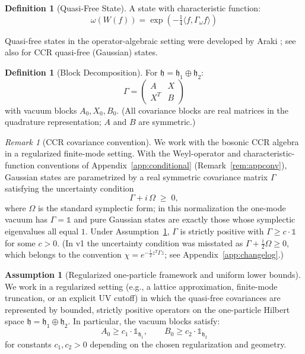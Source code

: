 \documentclass[11pt,a4paper]{article}
\newcommand{\idm}{\mathds{1}}}{\newcommand{\idm}{\mathbf{1}}}
\theoremstyle{plain}
\theoremstyle{definition}
\newtheorem{definition}[theorem]{Definition}
\newtheorem{assumption}[theorem]{Assumption}
\theoremstyle{remark}
\newtheorem{remark}[theorem]{Remark}
\newcommand{\hh}{\mathfrak{h}}
\begin{document}
\begin{definition}[Quasi-Free State]
A state with characteristic function:
\begin{equation}
\omega(W(f)) = \exp\left(-\tfrac{1}{4}\langle f, \Gamma_\omega f\rangle\right)
\end{equation}
\end{definition}

Quasi-free states in the operator-algebraic setting were developed by Araki
\cite{Araki64,Araki70}; see also \cite[Chapter~12]{Holevo11} for CCR quasi-free
(Gaussian) states.

\begin{definition}[Block Decomposition]
For $\hh = \hh_1 \oplus \hh_2$:
\begin{equation}
\Gamma = \begin{pmatrix} A & X \\ X^T & B \end{pmatrix}
\end{equation}
with vacuum blocks $A_0, X_0, B_0$. (All covariance blocks are real matrices in the
quadrature representation; $A$ and $B$ are symmetric.)
\end{definition}

\begin{remark}[CCR covariance convention]\label{rem:convention}
We work with the bosonic CCR algebra in a regularized finite-mode setting. With the
Weyl-operator and characteristic-function conventions of
Appendix~\ref{app:conditional} (Remark~\ref{rem:appconv}), Gaussian states are
parametrized by a real symmetric covariance matrix $\Gamma$ satisfying the
uncertainty condition
\begin{equation}
\Gamma + i\,\Omega \;\ge\; 0,
\end{equation}
where $\Omega$ is the standard symplectic form; in this normalization the one-mode
vacuum has $\Gamma = \idm$ and pure Gaussian states are exactly those whose
symplectic eigenvalues all equal $1$. Under Assumption~\ref{ass:reg}, $\Gamma$ is
strictly positive with $\Gamma \ge c \cdot \idm$ for some $c > 0$.
(In v1 the uncertainty condition was misstated as
$\Gamma + \tfrac{i}{2}\Omega \ge 0$, which belongs to the convention
$\chi = e^{-\frac{1}{2}z^T\Gamma z}$; see Appendix~\ref{app:changelog}.)
\end{remark}

\begin{assumption}[Regularized one-particle framework and uniform lower bounds]
\label{ass:reg}
We work in a regularized setting (e.g., a lattice approximation, finite-mode
truncation, or an explicit UV cutoff) in which the quasi-free covariances are
represented by bounded, strictly positive operators on the one-particle Hilbert
space $\hh = \hh_1 \oplus \hh_2$. In particular, the vacuum blocks satisfy:
\begin{equation}
A_0 \ge c_1 \cdot \idm_{\hh_1}, \qquad B_0 \ge c_2 \cdot \idm_{\hh_2}
\end{equation}
for constants $c_1, c_2 > 0$ depending on the chosen regularization and geometry.
\end{assumption}
\end{document}
